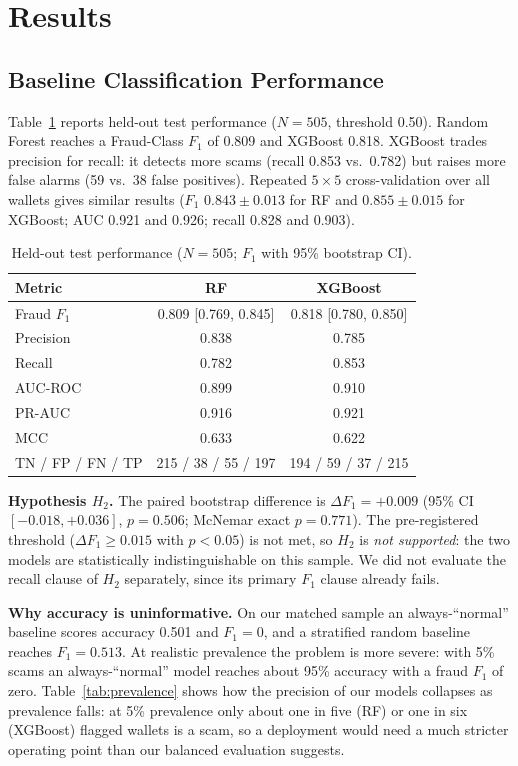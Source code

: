 \documentclass[conference]{IEEEtran}
\begin{document}
\section{Results}
\label{sec:results}

\subsection{Baseline Classification Performance}
\label{sec:baseline}
Table~\ref{tab:baseline} reports held-out test performance ($N=505$, threshold 0.50). Random Forest reaches a Fraud-Class $F_1$ of 0.809 and XGBoost 0.818. XGBoost trades precision for recall: it detects more scams (recall 0.853 vs.\ 0.782) but raises more false alarms (59 vs.\ 38 false positives). Repeated $5\times5$ cross-validation over all wallets gives similar results ($F_1$ $0.843 \pm 0.013$ for RF and $0.855 \pm 0.015$ for XGBoost; AUC 0.921 and 0.926; recall 0.828 and 0.903).

\begin{table}[!t]
\centering
\caption{Held-out test performance ($N=505$; $F_1$ with 95\% bootstrap CI).}
\label{tab:baseline}
\footnotesize
\setlength{\tabcolsep}{4pt}
\begin{tabular}{lcc}
\toprule
Metric & RF & XGBoost \\
\midrule
Fraud $F_1$ & 0.809 [0.769, 0.845] & 0.818 [0.780, 0.850] \\
Precision & 0.838 & 0.785 \\
Recall & 0.782 & 0.853 \\
AUC-ROC & 0.899 & 0.910 \\
PR-AUC & 0.916 & 0.921 \\
MCC & 0.633 & 0.622 \\
TN / FP / FN / TP & 215 / 38 / 55 / 197 & 194 / 59 / 37 / 215 \\
\bottomrule
\end{tabular}
\end{table}

\textbf{Hypothesis $H_2$.} The paired bootstrap difference is $\Delta F_1 = +0.009$ (95\% CI $[-0.018, +0.036]$, $p=0.506$; McNemar exact $p=0.771$). The pre-registered threshold ($\Delta F_1 \ge 0.015$ with $p<0.05$) is not met, so $H_2$ is \emph{not supported}: the two models are statistically indistinguishable on this sample. We did not evaluate the recall clause of $H_2$ separately, since its primary $F_1$ clause already fails.

\textbf{Why accuracy is uninformative.} On our matched sample an always-``normal'' baseline scores accuracy 0.501 and $F_1=0$, and a stratified random baseline reaches $F_1=0.513$. At realistic prevalence the problem is more severe: with 5\% scams an always-``normal'' model reaches about 95\% accuracy with a fraud $F_1$ of zero. Table~\ref{tab:prevalence} shows how the precision of our models collapses as prevalence falls: at 5\% prevalence only about one in five (RF) or one in six (XGBoost) flagged wallets is a scam, so a deployment would need a much stricter operating point than our balanced evaluation suggests.
\end{document}

